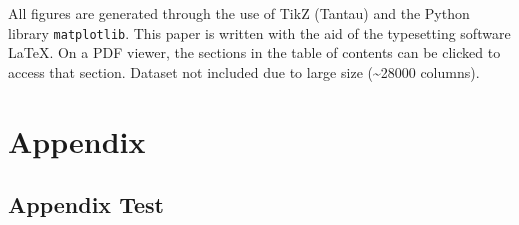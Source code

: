 \documentclass[11pt,letterpaper]{article}
\begin{document}
All figures are generated through the use of TikZ (Tantau) and the Python library \verb|matplotlib|. This paper is written with the aid of the typesetting software \LaTeX. On a PDF viewer, the sections in the table of contents can be clicked to access that section. Dataset not included due to large size (\textasciitilde 28000 columns).

\printbibliography[heading=bibintoc, title=Works Cited]

\appendix
\section{Appendix}
\label{app}

\subsection{Appendix Test}
\label{app:test}
\end{document}
